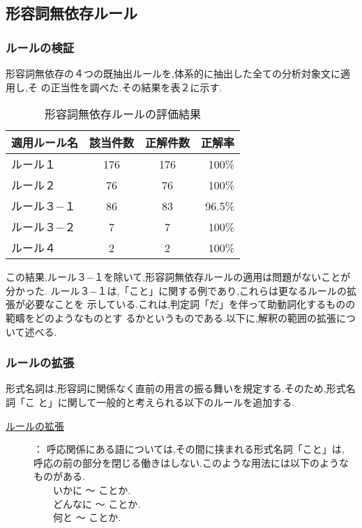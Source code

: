 \subsection{形容詞無依存ルール}
\subsubsection{ルールの検証}

形容詞無依存の４つの既抽出ルールを,体系的に抽出した全ての分析対象文に適用し,そ
の正当性を調べた.その結果を表２に示す.
\begin{table}[h]
\caption{形容詞無依存ルールの評価結果}
\begin{center}
  \begin{tabular}{|l|c|c|r|} \hline
    適用ルール名 & 該当件数 & 正解件数 & 正解率\\ \hline
    ルール１ & 176 & 176 & 100\% \\ \hline
    ルール２ & 76  & 76  & 100\% \\ \hline
    ルール３−１ & 86 & 83 & 96.5\% \\ \hline
    ルール３−２ & 7 & 7 & 100\% \\ \hline
    ルール４ & 2 & 2 & 100\% \\ \hline
  \end{tabular}
\end{center}
\end{table}
この結果,ルール３−１を除いて,形容詞無依存ルールの適用は問題がないことが分かった.
ルール３−１は,「こと」に関する例であり,これらは更なるルールの拡張が必要なことを
示している.これは,判定詞「だ」を伴って助動詞化するものの範疇をどのようなものとす
るかというものである.以下に,解釈の範囲の拡張について述べる.

\subsubsection{ルールの拡張}

形式名詞は,形容詞に関係なく直前の用言の振る舞いを規定する.そのため,形式名詞「こ
と」に関して一般的と考えられる以下のルールを追加する.
{\bf \begin{description}
\item[\underline{ルールの拡張}]： 呼応関係にある語については,その間に挟まれる形式名詞「こと」は,
呼応の前の部分を閉じる働きはしない.このような用法には以下のようなものがある.\\
      　　いかに 〜 ことか.\\
      　　どんなに 〜 ことか.\\
      　　何と 〜 ことか.
\end{description}}

